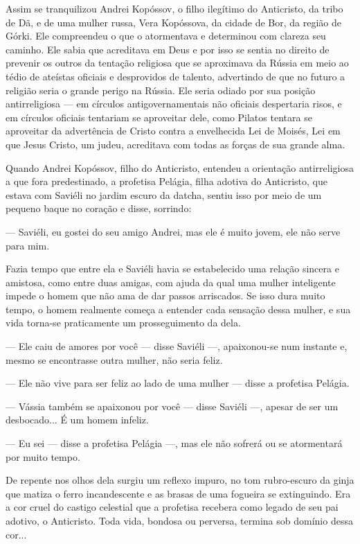 Assim se tranquilizou Andrei Kopóssov, o filho ilegítimo do Anticristo,
da tribo de Dã, e de uma mulher russa, Vera Kopóssova, da cidade de Bor,
da região de Górki. Ele compreendeu o que o atormentava e determinou com
clareza seu caminho. Ele sabia que acreditava em Deus e por isso se
sentia no direito de prevenir os outros da tentação religiosa que se
aproximava da Rússia em meio ao tédio de ateístas oficiais e desprovidos
de talento, advertindo de que no futuro a religião seria o grande perigo
na Rússia. Ele seria odiado por sua posição antirreligiosa --- em
círculos antigovernamentais não oficiais despertaria risos, e em
círculos oficiais tentariam se aproveitar dele, como Pilatos tentara se
aproveitar da advertência de Cristo contra a envelhecida Lei de Moisés,
Lei em que Jesus Cristo, um judeu, acreditava com todas as forças de sua
grande alma.

Quando Andrei Kopóssov, filho do Anticristo, entendeu a orientação
antirreligiosa a que fora predestinado, a profetisa Pelágia, filha
adotiva do Anticristo, que estava com Saviéli no jardim escuro da
datcha, sentiu isso por meio de um pequeno baque no coração e disse,
sorrindo:

--- Saviéli, eu gostei do seu amigo Andrei, mas ele é muito jovem, ele
não serve para mim.

Fazia tempo que entre ela e Saviéli havia se estabelecido uma relação
sincera e amistosa, como entre duas amigas, com ajuda da qual uma mulher
inteligente impede o homem que não ama de dar passos arriscados. Se isso
dura muito tempo, o homem realmente começa a entender cada sensação
dessa mulher, e sua vida torna-se praticamente um prosseguimento da
dela.

--- Ele caiu de amores por você --- disse Saviéli ---, apaixonou-se num
instante e, mesmo se encontrasse outra mulher, não seria feliz.

--- Ele não vive para ser feliz ao lado de uma mulher --- disse a
profetisa Pelágia.

--- Vássia também se apaixonou por você --- disse Saviéli ---, apesar de
ser um desbocado... É um homem infeliz.

--- Eu sei --- disse a profetisa Pelágia ---, mas ele não sofrerá ou se
atormentará por muito tempo.

De repente nos olhos dela surgiu um reflexo impuro, no tom rubro-escuro
da ginja que matiza o ferro incandescente e as brasas de uma fogueira se
extinguindo. Era a cor cruel do castigo celestial que a profetisa
recebera como legado de seu pai adotivo, o Anticristo. Toda vida,
bondosa ou perversa, termina sob domínio dessa cor...

